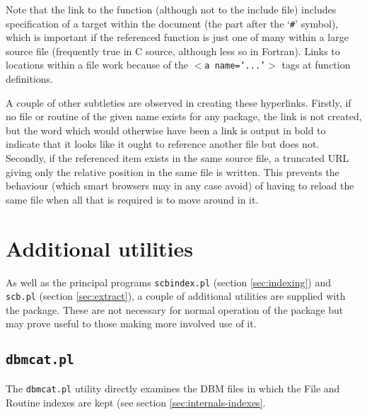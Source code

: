 \documentclass[twoside,11pt]{article}
\newcommand{\xlabel}[1]{}
\renewcommand{\_}{\texttt{\symbol{95}}}
\begin{document}
Note that the link to the function (although not to the include file)
includes specification of a target within the document
(the part after the `{\tt \#}' symbol), 
which is important if the referenced function is just one of many within a
large source file (frequently true in C source, although less so in Fortran).
Links to locations within a file work because of the
{\tt $<$a~name='...'$>$} tags at function definitions.

A couple of other subtleties are observed in creating these hyperlinks.
Firstly, if no file or routine of the given name exists for any package,
the link is not created, but the word which would otherwise have
been a link is output in bold to indicate that it looks
like it ought to reference another file but does not.
Secondly, if the referenced item exists in the same source file,
a truncated URL giving only the relative position in the same
file is written.  This prevents the behaviour (which smart browsers
may in any case avoid) of having to reload the same file when all
that is required is to move around in it.


\section{\xlabel{sec:utilities}\label{sec:utilities}Additional utilities}

As well as the principal programs
{\tt scbindex.pl} (section \ref{sec:indexing})
and 
{\tt scb.pl} (section \ref{sec:extract}),
a couple of additional utilities are supplied with the package.
These are not necessary for normal operation 
of the package but may prove useful to those making more 
involved use of it.




\subsection{\xlabel{sec:dbmcat}\label{sec:dbmcat}{\tt dbmcat.pl}}

The {\tt dbmcat.pl} utility directly examines the DBM files 
in which the File and Routine indexes are kept 
(see section \ref{sec:internals-indexes}.
\end{document}
